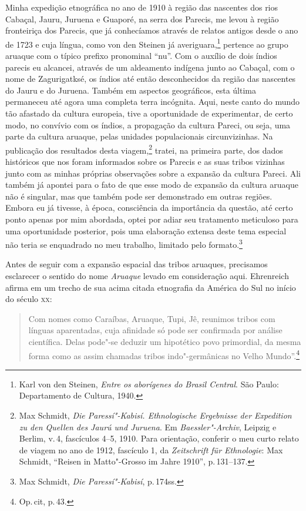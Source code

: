 Minha expedição etnográfica no ano de 1910 à região das nascentes dos
rios Cabaçal, Jauru, Juruena e Guaporé, na serra dos Parecis, me levou à
região fronteiriça dos Parecis, que já conhecíamos através de relatos
antigos desde o ano de 1723 e cuja língua, como von den Steinen já
averiguara,\footnote{Karl von den Steinen, \textit{Entre os aborígenes do Brasil Central}. São Paulo: Departamento de Cultura, 1940.} pertence ao grupo aruaque com o
típico prefixo pronominal ``nu''. Com o auxílio de dois índios parecis
eu alcancei, através de um aldeamento indígena junto ao Cabaçal, com o
nome de Zagurigatksé, os índios até então desconhecidos da região das
nascentes do Jauru e do Juruena. Também em aspectos geográficos, esta
última permaneceu até agora uma completa terra incógnita. Aqui, neste
canto do mundo tão afastado da cultura europeia, tive a oportunidade de
experimentar, de certo modo, no convívio com os índios, a propagação da
cultura Pareci, ou seja, uma parte da cultura aruaque, pelas unidades
populacionais circunvizinhas. Na publicação dos resultados desta
viagem,\footnote{Max Schmidt, \textit{Die Paressí"-Kabisí. Ethnologische
  Ergebnisse der Expedition zu den Quellen des Jaurú und Juruena}. Em \textit{Baessler"-Archiv}, Leipzig e Berlim, v.\,4, fascículos 4--5, 1910. Para orientação, conferir o meu curto
  relato de viagem no ano de 1912, fascículo 1, da \textit{Zeitschrift für
  Ethnologie}: Max Schmidt, ``Reisen in Matto"-Grosso im Jahre 1910'', p.\,131--137.} tratei, na
primeira parte, dos dados históricos que nos foram informados sobre os
Parecis e as suas tribos vizinhas junto com as minhas próprias
observações sobre a expansão da cultura Pareci. Ali também já apontei
para o fato de que esse modo de expansão da cultura aruaque não é singular, mas que
também pode ser demonstrado em outras regiões. Embora eu já tivesse,
à época, consciência da importância da questão, até certo ponto apenas
por mim abordada, optei por adiar seu
tratamento meticuloso para uma oportunidade posterior, pois uma
elaboração extensa deste tema especial não teria se enquadrado no meu
trabalho, limitado pelo formato.\footnote{Max Schmidt, \textit{Die
  Paressí"-Kabisí}, p.\,174ss.}

Antes de seguir com a expansão espacial das tribos aruaques, precisamos
esclarecer o sentido do nome \textit{Aruaque} levado em consideração aqui.
Ehrenreich afirma em um trecho de sua acima citada etnografia da América
do Sul no início do século \textsc{xx}: 

\begin{quote}
Com nomes como Caraíbas, Aruaque, Tupi,
Jê, reunimos tribos com línguas aparentadas, cuja afinidade só pode ser
confirmada por análise científica. Delas pode"-se deduzir um hipotético
povo primordial, da mesma forma como as assim chamadas tribos
indo"-germânicas no Velho Mundo''.\footnote{Op.\,cit, p.\,43.}
\end{quote}


